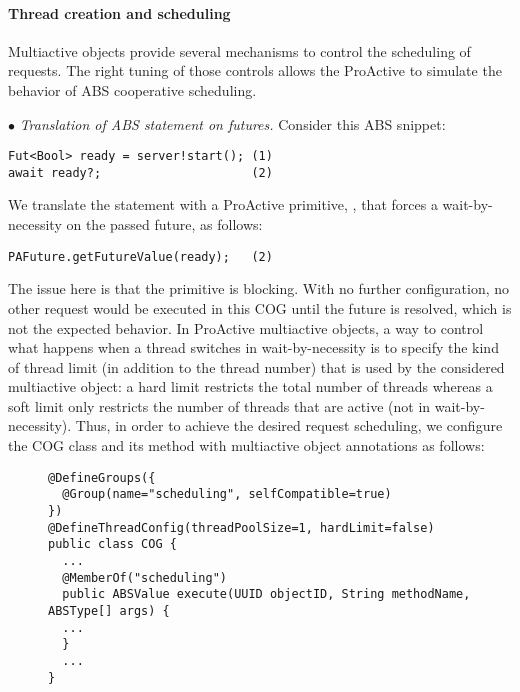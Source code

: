 \paragraph{Thread creation and scheduling}
Multiactive objects provide several mechanisms to control the scheduling of requests. The right tuning of those controls allows the ProActive to simulate the behavior of ABS cooperative scheduling.

\smallskip
$\bullet$ \textit{Translation of ABS  statement on futures.}
Consider this ABS snippet:
\lstset{ numberstyle=\tiny, stepnumber=1, numbersep=2pt, basicstyle=\ttfamily\scriptsize, keywordstyle=\bfseries,
    showstringspaces=false}
\begin{lstlisting}
Fut<Bool> ready = server!start(); (1)
await ready?;                     (2)
\end{lstlisting}
We translate the  statement with a ProActive primitive, , that forces a wait-by-necessity on the passed future, as follows:
\begin{lstlisting}
PAFuture.getFutureValue(ready);   (2)
\end{lstlisting}
The issue here is that the  primitive is blocking. With no further configuration, no other request would be executed in this COG until the future is resolved, which is not the expected behavior. 
In ProActive multiactive objects, a way to control what happens when a thread switches in wait-by-necessity is to specify the kind of thread limit (in addition to the thread number) that is used by the considered multiactive object: a hard limit restricts the total number of threads whereas a soft limit only restricts the number of threads that are active (not in wait-by-necessity).
Thus, in order to achieve the desired request scheduling, we configure the COG class and its  method with multiactive object annotations as follows:
\begin{figure}[!h]
	\setlength\abovecaptionskip{0.25mm}
\begin{lstlisting}
@DefineGroups({
  @Group(name="scheduling", selfCompatible=true)
})
@DefineThreadConfig(threadPoolSize=1, hardLimit=false)
public class COG {
  ...
  @MemberOf("scheduling")
  public ABSValue execute(UUID objectID, String methodName, ABSType[] args) {
  ...
  }
  ...
}
\end{lstlisting}
\end{figure}
